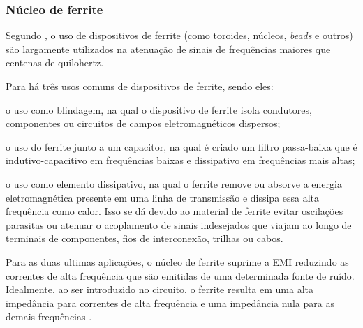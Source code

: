             \subsubsection{Núcleo de ferrite} \label{cap:fund_emc_conv_mitig_choke}
            
            Segundo , o uso de dispositivos de ferrite (como toroides, núcleos, \textit{beads} e outros) são largamente utilizados na atenuação de sinais de frequências maiores que centenas de quilohertz. 
            
            Para  há três usos comuns de dispositivos de ferrite, sendo eles:  
            
            \begin{alineas}
                \item o uso como blindagem, na qual o dispositivo de ferrite isola condutores, componentes ou circuitos de campos eletromagnéticos dispersos;
                
                \item o uso do ferrite junto a um capacitor, na qual é criado um filtro passa-baixa que é indutivo-capacitivo em frequências baixas e dissipativo em frequências mais altas;
                
                \item o uso como elemento dissipativo, na qual o ferrite remove ou absorve a energia eletromagnética presente em uma linha de transmissão e dissipa essa alta frequência como calor. Isso se dá devido ao material de ferrite evitar oscilações parasitas ou atenuar o acoplamento de sinais indesejados que viajam ao longo de terminais de componentes, fios de interconexão, trilhas ou cabos. 
            \end{alineas}
            
            Para as duas ultimas aplicações, o núcleo de ferrite suprime a EMI reduzindo as correntes de alta frequência que são emitidas de uma determinada fonte de ruído. Idealmente, ao ser introduzido no circuito, o ferrite resulta em uma alta impedância para correntes de alta frequência e uma impedância nula para as demais frequências \cite{ref:EMC_livro_PrintedCircuit}. 
            

